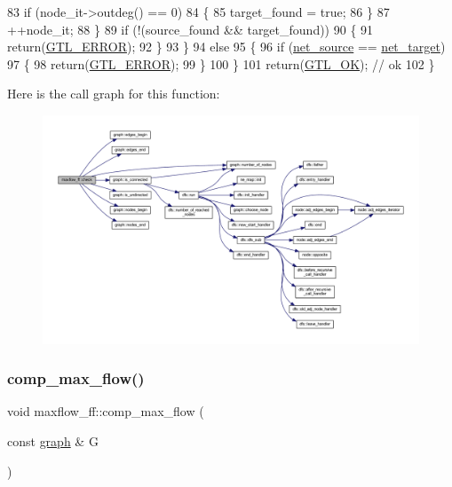 \begin{DoxyCode}
83         \textcolor{keywordflow}{if} (node\_it->outdeg() == 0)
84         \{
85         target\_found = \textcolor{keyword}{true};
86         \}
87         ++node\_it;
88     \}
89     \textcolor{keywordflow}{if} (!(source\_found && target\_found))
90     \{
91         \textcolor{keywordflow}{return}(\mbox{\hyperlink{classalgorithm_af1a0078e153aa99c24f9bdf0d97f6710a6fcf574690bbd6cf710837a169510dd7}{GTL\_ERROR}});
92     \}
93     \}
94     \textcolor{keywordflow}{else}
95     \{
96     \textcolor{keywordflow}{if} (\mbox{\hyperlink{classmaxflow__ff_a2e4cc02ce8c9d929f2896525c686d6c1}{net\_source}} == \mbox{\hyperlink{classmaxflow__ff_a94d5db73364cf5824ec3d3d530b57319}{net\_target}})
97     \{
98         \textcolor{keywordflow}{return}(\mbox{\hyperlink{classalgorithm_af1a0078e153aa99c24f9bdf0d97f6710a6fcf574690bbd6cf710837a169510dd7}{GTL\_ERROR}});
99     \}
100     \}
101     \textcolor{keywordflow}{return}(\mbox{\hyperlink{classalgorithm_af1a0078e153aa99c24f9bdf0d97f6710a5114c20e4a96a76b5de9f28bf15e282b}{GTL\_OK}});   \textcolor{comment}{// ok}
102 \}
\end{DoxyCode}
Here is the call graph for this function\+:\nopagebreak
\begin{figure}[H]
\begin{center}
\leavevmode
\includegraphics[width=350pt]{classmaxflow__ff_a4d0deee7d70bac4c9dad942341d87e37_cgraph}
\end{center}
\end{figure}
\mbox{\label{classmaxflow__ff_a560d27c4c62b46dcb0a36ac60ebc1efb}} 
\subsubsection{\texorpdfstring{comp\+\_\+max\+\_\+flow()}{comp\_max\_flow()}}
{\footnotesize\ttfamily void maxflow\+\_\+ff\+::comp\+\_\+max\+\_\+flow (\begin{DoxyParamCaption}\item[{const \mbox{\hyperlink{classgraph}{graph}} \&}]{G }\end{DoxyParamCaption})\hspace{0.3cm}{\ttfamily [protected]}}



